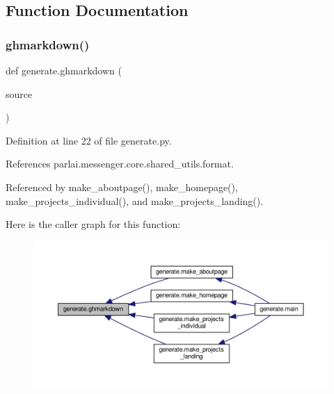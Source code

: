 \subsection{Function Documentation}
\mbox{\label{namespacegenerate_a7811fd26fa2e3aeec0e3d3851cdda546}} 
\subsubsection{\texorpdfstring{ghmarkdown()}{ghmarkdown()}}
{\footnotesize\ttfamily def generate.\+ghmarkdown (\begin{DoxyParamCaption}\item[{}]{source }\end{DoxyParamCaption})}



Definition at line 22 of file generate.\+py.



References parlai.\+messenger.\+core.\+shared\+\_\+utils.\+format.



Referenced by make\+\_\+aboutpage(), make\+\_\+homepage(), make\+\_\+projects\+\_\+individual(), and make\+\_\+projects\+\_\+landing().

Here is the caller graph for this function\+:
\nopagebreak
\begin{figure}[H]
\begin{center}
\leavevmode
\includegraphics[width=350pt]{namespacegenerate_a7811fd26fa2e3aeec0e3d3851cdda546_icgraph}
\end{center}
\end{figure}
\mbox{\label{namespacegenerate_a7f0253880883fcd9badd715587a15668}} 
